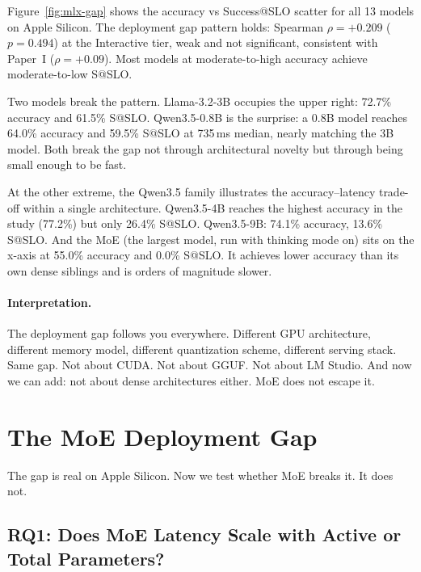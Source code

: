 \documentclass[11pt]{article}
\begin{document}
Figure~\ref{fig:mlx-gap} shows the accuracy vs Success@SLO scatter for all 13 models on Apple Silicon.  The deployment gap pattern holds: Spearman $\rho = +0.209$ ($p = 0.494$) at the Interactive tier, weak and not significant, consistent with Paper~I ($\rho = +0.09$).  Most models at moderate-to-high accuracy achieve moderate-to-low S@SLO.

Two models break the pattern.  Llama-3.2-3B occupies the upper right: 72.7\% accuracy and 61.5\% S@SLO.  Qwen3.5-0.8B is the surprise: a 0.8B model reaches 64.0\% accuracy and 59.5\% S@SLO at 735\,ms median, nearly matching the 3B model.  Both break the gap not through architectural novelty but through being small enough to be fast.

At the other extreme, the Qwen3.5 family illustrates the accuracy--latency trade-off within a single architecture.  Qwen3.5-4B reaches the highest accuracy in the study (77.2\%) but only 26.4\% S@SLO.  Qwen3.5-9B: 74.1\% accuracy, 13.6\% S@SLO.  And the MoE (the largest model, run with thinking mode on) sits on the x-axis at 55.0\% accuracy and 0.0\% S@SLO.  It achieves lower accuracy than its own dense siblings and is orders of magnitude slower.

\paragraph{Interpretation.}
The deployment gap follows you everywhere.  Different GPU architecture, different memory model, different quantization scheme, different serving stack.  Same gap.  Not about CUDA.  Not about GGUF.  Not about LM Studio.  And now we can add: not about dense architectures either.  MoE does not escape it.


\section{The MoE Deployment Gap}
\label{sec:moe-gap}

The gap is real on Apple Silicon.  Now we test whether MoE breaks it.  It does not.

\subsection{RQ1: Does MoE Latency Scale with Active or Total Parameters?}
\label{sec:rq1-latency}
\end{document}

